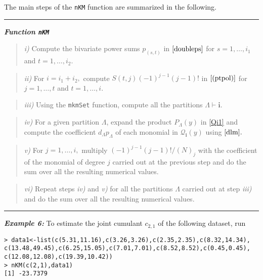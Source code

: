 \hskip-0.5cm The main steps of the \texttt{nKM} function are summarized
in the following.

\noindent

\rule{13cm}{0.4pt}

\textbf{\emph{Function \texttt{nKM}}}

\begin{quote}
\emph{i)} Compute the bivariate power sums \(p_{(s,t)}\) in
\(\eqref{doubleps}\) for \(s=1, \ldots,i_1\) and \(t=1, \ldots, i_2.\)
\end{quote}

\begin{quote}
\emph{ii)} For \(i=i_1+i_2,\) compute \(S(t,j) (-1)^{j-1} (j-1)!\) in
\(\eqref{(ptpol)}\) for \(j=1, \ldots,t\) and \(t=1,\ldots,i.\)
\end{quote}

\begin{quote}
\emph{iii)} Using the \texttt{mkmSet} function, compute all the
partitions \(\Lambda \vdash \boldsymbol{i}.\)
\end{quote}

\begin{quote}
\emph{iv)} For a given partition \(\Lambda\), expand the product
\(P_{\Lambda}(y)\) in \eqref{Qi1} and compute the coefficient
\(d_{\Lambda} p_{\Lambda}\) of each monomial in
\({\mathcal Q}_{\boldsymbol{i}}(y)\) using \(\eqref{dlm}.\)
\end{quote}

\begin{quote}
\emph{v)} For \(j=1, \ldots, i,\) multiply \((-1)^{j-1} (j-1)!/(N)_j\)
with the coefficient of the monomial of degree \(j\) carried out at the
previous step and do the sum over all the resulting numerical values.
\end{quote}

\begin{quote}
\emph{vi)} Repeat steps \emph{iv)} and \emph{v)} for all the partitions
\(\Lambda\) carried out at step \emph{iii)} and do the sum over all the
resulting numerical values.
\end{quote}

\noindent

\rule{13cm}{0.4pt}

\hskip-0.5cm\textbf{\emph{Example 6:}} To estimate the joint cumulant
\(c_{2,1}\) of the following dataset, run

\begin{verbatim}
> data1<-list(c(5.31,11.16),c(3.26,3.26),c(2.35,2.35),c(8.32,14.34),
c(13.48,49.45),c(6.25,15.05),c(7.01,7.01),c(8.52,8.52),c(0.45,0.45),
c(12.08,12.08),c(19.39,10.42))
> nKM(c(2,1),data1)
[1] -23.7379
\end{verbatim}

